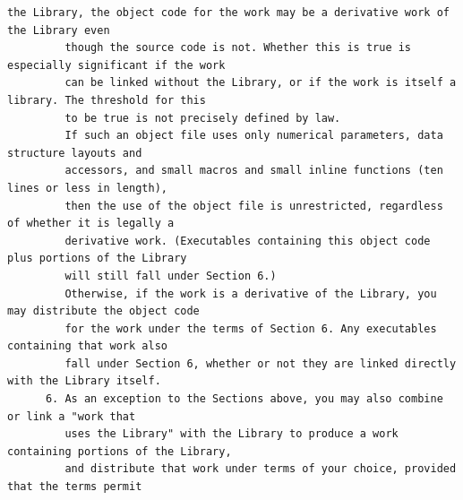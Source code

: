 \begin{lstlisting}[basicstyle=\ttfamily\footnotesize,breaklines=true]
         the Library, the object code for the work may be a derivative work of the Library even
         though the source code is not. Whether this is true is especially significant if the work
         can be linked without the Library, or if the work is itself a library. The threshold for this
         to be true is not precisely defined by law.
         If such an object file uses only numerical parameters, data structure layouts and
         accessors, and small macros and small inline functions (ten lines or less in length),
         then the use of the object file is unrestricted, regardless of whether it is legally a
         derivative work. (Executables containing this object code plus portions of the Library
         will still fall under Section 6.)
         Otherwise, if the work is a derivative of the Library, you may distribute the object code
         for the work under the terms of Section 6. Any executables containing that work also
         fall under Section 6, whether or not they are linked directly with the Library itself.
      6. As an exception to the Sections above, you may also combine or link a "work that
         uses the Library" with the Library to produce a work containing portions of the Library,
         and distribute that work under terms of your choice, provided that the terms permit





\end{lstlisting}
